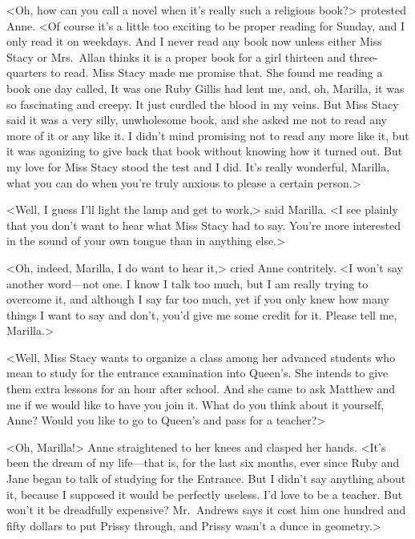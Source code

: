 <Oh, how can you call  a novel when it's really such a religious book?> protested Anne. <Of course it's a little too exciting to be proper reading for Sunday, and I only read it on weekdays. And I never read any book now unless either Miss Stacy or Mrs.~Allan thinks it is a proper book for a girl thirteen and three-quarters to read. Miss Stacy made me promise that. She found me reading a book one day called,  It was one Ruby Gillis had lent me, and, oh, Marilla, it was so fascinating and creepy. It just curdled the blood in my veins. But Miss Stacy said it was a very silly, unwholesome book, and she asked me not to read any more of it or any like it. I didn't mind promising not to read any more like it, but it was agonizing to give back that book without knowing how it turned out. But my love for Miss Stacy stood the test and I did. It's really wonderful, Marilla, what you can do when you're truly anxious to please a certain person.>

<Well, I guess I'll light the lamp and get to work,> said Marilla. <I see plainly that you don't want to hear what Miss Stacy had to say. You're more interested in the sound of your own tongue than in anything else.>

<Oh, indeed, Marilla, I do want to hear it,> cried Anne contritely. <I won't say another word—not one. I know I talk too much, but I am really trying to overcome it, and although I say far too much, yet if you only knew how many things I want to say and don't, you'd give me some credit for it. Please tell me, Marilla.>

<Well, Miss Stacy wants to organize a class among her advanced students who mean to study for the entrance examination into Queen's. She intends to give them extra lessons for an hour after school. And she came to ask Matthew and me if we would like to have you join it. What do you think about it yourself, Anne? Would you like to go to Queen's and pass for a teacher?>

<Oh, Marilla!> Anne straightened to her knees and clasped her hands. <It's been the dream of my life—that is, for the last six months, ever since Ruby and Jane began to talk of studying for the Entrance. But I didn't say anything about it, because I supposed it would be perfectly useless. I'd love to be a teacher. But won't it be dreadfully expensive? Mr.~Andrews says it cost him one hundred and fifty dollars to put Prissy through, and Prissy wasn't a dunce in geometry.>

